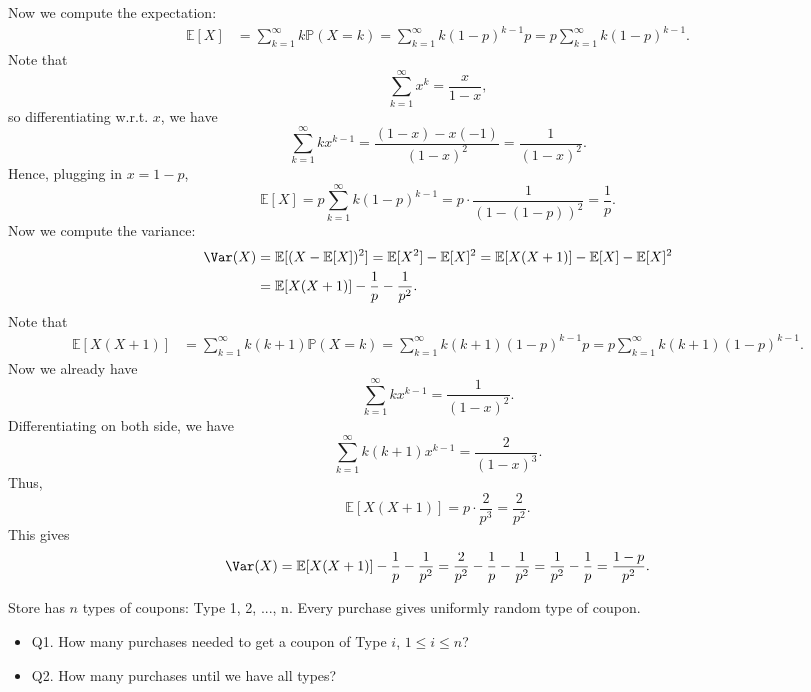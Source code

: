 Now we compute the expectation:
\begin{align*}
    \mathbb{E} [X] &= \sum_{k=1}^{\infty} k \mathbb{P} (X = k) = \sum_{k=1}^{\infty} k (1 - p)^{k-1} p = p \sum_{k=1}^{\infty} k (1-p)^{k-1}.   
\end{align*}
Note that 
\[
    \sum_{k=1}^{\infty} x^k = \frac{x}{1-x}, 
\]
so differentiating w.r.t. \(x\), we have 
\[
    \sum_{k=1}^{\infty} kx^{k-1} = \frac{(1-x) - x(-1)}{(1-x)^2} = \frac{1}{(1-x)^2}.
\] 
Hence, plugging in \(x = 1 - p\),
\[
    \mathbb{E} [X] = p \sum_{k=1}^{\infty} k(1 - p)^{k-1} = p \cdot \frac{1}{(1 - (1-p))^2} = \frac{1}{p}.
\] 
Now we compute the variance:
\begin{align*}
    \Var(X) &= \mathbb{E} [(X - \mathbb{E} [X])^2] = \mathbb{E} [X^2] - \mathbb{E} [X]^2 = \mathbb{E} [X(X + 1)] - \mathbb{E} [X] - \mathbb{E} [X]^2 \\
    &= \mathbb{E} [X(X + 1)] - \frac{1}{p} - \frac{1}{p^2 }.
\end{align*}
Note that 
\begin{align*}
    \mathbb{E} [X(X + 1)] &= \sum_{k=1}^{\infty} k(k + 1) \mathbb{P} (X = k) = \sum_{k=1}^{\infty} k(k + 1) (1 - p)^{k - 1} p = p \sum_{k=1}^{\infty} k(k + 1) (1 - p)^{k - 1}.   
\end{align*}
Now we already have 
\[
    \sum_{k=1}^{\infty} k x^{k - 1} = \frac{1}{(1 - x)^2}. 
\]
Differentiating on both side, we have 
\[
    \sum_{k=1}^{\infty} k(k + 1) x^{k - 1} = \frac{2}{(1 - x)^3}. 
\]
Thus,
\[
    \mathbb{E} [X(X + 1)] = p \cdot \frac{2}{p^3} = \frac{2}{p^2}.
\]
This gives 
\[
    \Var(X) = \mathbb{E} [X(X + 1)] - \frac{1}{p} - \frac{1}{p^2} = \frac{2}{p^2} - \frac{1}{p} - \frac{1}{p^2} = \frac{1}{p^2} - \frac{1}{p} = \frac{1-p}{p^2}.
\]
\begin{eg}
    Store has \(n\) types of coupons: Type 1, 2, ..., n. Every purchase gives uniformly random type of coupon. 
    \begin{itemize}
        \item Q1. How many purchases needed to get a coupon of Type \(i\), \(1 \le i \le n\)? 
        \item Q2. How many purchases until we have all types?  
    \end{itemize} 
\end{eg}

